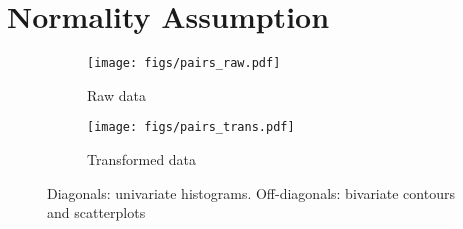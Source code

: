\section{Normality Assumption}

\begin{figure}[H]
    \centering
    \begin{subfigure}{.5\textwidth}
        \centering
        \texttt{[image: figs/pairs\_raw.pdf]}
        \caption{Raw data}
    \end{subfigure}%
    \begin{subfigure}{.5\textwidth}
        \centering
        \texttt{[image: figs/pairs\_trans.pdf]}
        \caption{Transformed data}
    \end{subfigure}
    \caption{Diagonals: univariate histograms. Off-diagonals: bivariate contours and scatterplots}
\end{figure}

